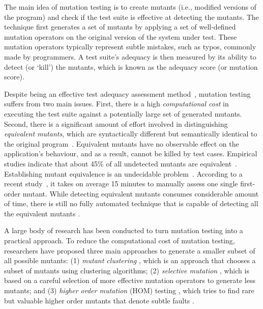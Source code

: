 The main idea of mutation testing is to create mutants (i.e., modified versions of the program) and check if the test suite is effective at detecting the mutants. 
The technique first generates a set of mutants by applying a set of well-defined mutation operators on the original version of the system under test. 
These mutation operators typically represent subtle mistakes, such as typos, commonly made by programmers. A test suite's adequacy is then measured by its ability to detect (or `kill') the mutants, which is known as the adequacy score (or mutation score).

Despite being an effective test adequacy assessment method~\cite{andrews:icse05,jia:tse10}, mutation testing suffers from two main issues.  First, there is a high \emph{computational cost} in executing the test suite against a potentially large set of generated mutants. Second, there is a significant amount of effort  involved in distinguishing \emph{equivalent mutants}, which are syntactically different but semantically identical to the original program~\cite{budd:acta82}.  Equivalent mutants have no observable effect on the application's behaviour, and as a result, cannot be killed by test cases. Empirical studies indicate that about 45\% of all undetected mutants are equivalent~\cite{schuler:tvr12, madeyski:tse13}.   
Establishing mutant equivalence is an undecidable problem~\cite{budd:acta82}. 
According to a recent study~\cite{madeyski:tse13}, it takes on average 15 minutes to manually assess one single first-order mutant. While detecting equivalent mutants consumes considerable amount of time, there is still no fully automated technique that is capable of detecting all the equivalent mutants \cite{madeyski:tse13}.

A large body of research has been conducted to turn mutation testing into a practical approach.
To reduce the computational cost of  mutation testing, researchers have
proposed three main approaches to generate a smaller subset of all possible mutants: 
(1) \emph{mutant clustering} \cite{ji:seke09}, which is an approach that chooses a subset of
mutants using clustering algorithms; (2)  \emph{selective mutation} \cite{barbosa:stvr01, siami:icse08, zhang:icse10}, which is based on a  
careful selection of more effective mutation operators to generate less mutants; and 
 (3) \emph{higher order mutation} (HOM) testing \cite{jia:scam08}, which tries to find 
rare but valuable higher order mutants that denote subtle faults \cite{jia:tse10}.   

